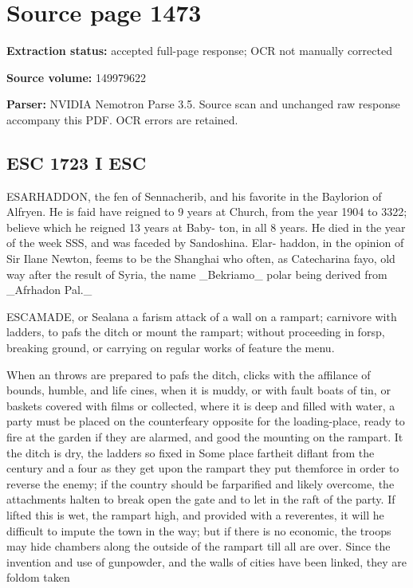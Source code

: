\clearpage
\section{Source page 1473}
\textbf{Extraction status:} accepted full-page response; OCR not manually corrected\par
\textbf{Source volume:} 149979622\par
\textbf{Parser:} NVIDIA Nemotron Parse 3.5. Source scan and unchanged raw response accompany this PDF. OCR errors are retained.\par\medskip
\subsection*{ESC 1723 I ESC}
ESARHADDON, the fen of Sennacherib, and his
favorite in the Baylorion of Alfryen. He is faid
have reigned to 9 years at Church, from the year 1904
to 3322; believe which he reigned 13 years at Baby-
ton, in all 8 years. He died in the year of the week
SSS, and was faceded by Sandoshina. Elar-
haddon, in the opinion of Sir Ilane Newton, feems to
be the Shanghai who often, as Catecharina fayo,
old way after the result of Syria, the name \_Bekriamo\_
polar being derived from \_Afrhadon Pal.\_\par\medskip
ESCAMADE, or Sealana a farism attack of a
wall on a rampart; carnivore with ladders, to pafs the
ditch or mount the rampart; without proceeding in
forsp, breaking ground, or carrying on regular works
of feature the menu.\par\medskip
When an throws are prepared to pafs the ditch,
clicks with the affilance of bounds, humble, and life
cines, when it is muddy, or with fault boats of tin, or
baskets covered with films or collected, where it is deep
and filled with water, a party must be placed on the
counterfeary opposite for the loading-place, ready to
fire at the garden if they are alarmed, and good the
mounting on the rampart. It the ditch is dry, the
ladders so fixed in Some place fartheit diflant from the
century and a four as they get upon the rampart
they put themforce in order to reverse the enemy; if
the country should be farparified and likely overcome,
the attachments halten to break open the gate and to
let in the raft of the party. If lifted this is wet, the
rampart high, and provided with a reverentes, it will
he difficult to impute the town in the way; but if
there is no economic, the troops may hide chambers
along the outside of the rampart till all are over. Since the invention and use of gunpowder, and the
walls of cities have been linked, they are foldom taken
